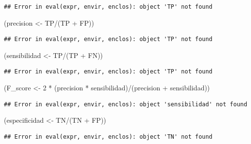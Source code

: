 \documentclass[
  12pt,
]{book}
\newenvironment{Shaded}{\begin{snugshade}}{\end{snugshade}}
\newcommand{\DecValTok}[1]{\textcolor[rgb]{0.00,0.00,0.81}{#1}}
\newcommand{\NormalTok}[1]{#1}
\newcommand{\OtherTok}[1]{\textcolor[rgb]{0.56,0.35,0.01}{#1}}
\newcommand{\SpecialCharTok}[1]{\textcolor[rgb]{0.00,0.00,0.00}{#1}}
\begin{document}
\begin{verbatim}
## Error in eval(expr, envir, enclos): object 'TP' not found
\end{verbatim}

\begin{Shaded}
\begin{Highlighting}[]
\NormalTok{(precision }\OtherTok{\textless{}{-}}\NormalTok{ TP}\SpecialCharTok{/}\NormalTok{(TP }\SpecialCharTok{+}\NormalTok{ FP))}
\end{Highlighting}
\end{Shaded}

\begin{verbatim}
## Error in eval(expr, envir, enclos): object 'TP' not found
\end{verbatim}

\begin{Shaded}
\begin{Highlighting}[]
\NormalTok{(sensibilidad }\OtherTok{\textless{}{-}}\NormalTok{ TP}\SpecialCharTok{/}\NormalTok{(TP }\SpecialCharTok{+}\NormalTok{ FN))}
\end{Highlighting}
\end{Shaded}

\begin{verbatim}
## Error in eval(expr, envir, enclos): object 'TP' not found
\end{verbatim}

\begin{Shaded}
\begin{Highlighting}[]
\NormalTok{(F\_score }\OtherTok{\textless{}{-}} \DecValTok{2} \SpecialCharTok{*}\NormalTok{ (precision }\SpecialCharTok{*}\NormalTok{ sensibilidad)}\SpecialCharTok{/}\NormalTok{(precision }\SpecialCharTok{+}
\NormalTok{    sensibilidad))}
\end{Highlighting}
\end{Shaded}

\begin{verbatim}
## Error in eval(expr, envir, enclos): object 'sensibilidad' not found
\end{verbatim}

\begin{Shaded}
\begin{Highlighting}[]
\NormalTok{(especificidad }\OtherTok{\textless{}{-}}\NormalTok{ TN}\SpecialCharTok{/}\NormalTok{(TN }\SpecialCharTok{+}\NormalTok{ FP))}
\end{Highlighting}
\end{Shaded}

\begin{verbatim}
## Error in eval(expr, envir, enclos): object 'TN' not found
\end{verbatim}
\end{document}
